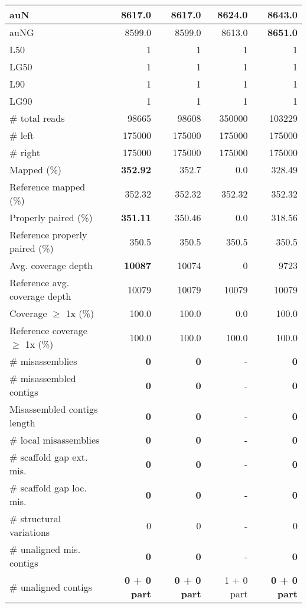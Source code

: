 \documentclass[12pt,a4paper]{article}
\begin{document}
\begin{table}[ht]
\begin{center}
\begin{tabular}{|l*{4}{|r}|}
auN & 8617.0 & 8617.0 & 8624.0 & {\bf 8643.0} \\ \hline
auNG & 8599.0 & 8599.0 & 8613.0 & {\bf 8651.0} \\ \hline
L50 & 1 & 1 & 1 & 1 \\ \hline
LG50 & 1 & 1 & 1 & 1 \\ \hline
L90 & 1 & 1 & 1 & 1 \\ \hline
LG90 & 1 & 1 & 1 & 1 \\ \hline
\# total reads & 98665 & 98608 & 350000 & 103229 \\ \hline
\# left & 175000 & 175000 & 175000 & 175000 \\ \hline
\# right & 175000 & 175000 & 175000 & 175000 \\ \hline
Mapped (\%) & {\bf 352.92} & 352.7 & 0.0 & 328.49 \\ \hline
Reference mapped (\%) & 352.32 & 352.32 & 352.32 & 352.32 \\ \hline
Properly paired (\%) & {\bf 351.11} & 350.46 & 0.0 & 318.56 \\ \hline
Reference properly paired (\%) & 350.5 & 350.5 & 350.5 & 350.5 \\ \hline
Avg. coverage depth & {\bf 10087} & 10074 & 0 & 9723 \\ \hline
Reference avg. coverage depth & 10079 & 10079 & 10079 & 10079 \\ \hline
Coverage $\geq$ 1x (\%) & 100.0 & 100.0 & 0.0 & 100.0 \\ \hline
Reference coverage $\geq$ 1x (\%) & 100.0 & 100.0 & 100.0 & 100.0 \\ \hline
\# misassemblies & {\bf 0} & {\bf 0} & - & {\bf 0} \\ \hline
\# misassembled contigs & {\bf 0} & {\bf 0} & - & {\bf 0} \\ \hline
Misassembled contigs length & {\bf 0} & {\bf 0} & - & {\bf 0} \\ \hline
\# local misassemblies & {\bf 0} & {\bf 0} & - & {\bf 0} \\ \hline
\# scaffold gap ext. mis. & {\bf 0} & {\bf 0} & - & {\bf 0} \\ \hline
\# scaffold gap loc. mis. & {\bf 0} & {\bf 0} & - & {\bf 0} \\ \hline
\# structural variations & 0 & 0 & - & 0 \\ \hline
\# unaligned mis. contigs & {\bf 0} & {\bf 0} & - & {\bf 0} \\ \hline
\# unaligned contigs & {\bf 0 + 0 part} & {\bf 0 + 0 part} & 1 + 0 part & {\bf 0 + 0 part} \\ \hline

\end{tabular}
\end{center}
\end{table}
\end{document}
